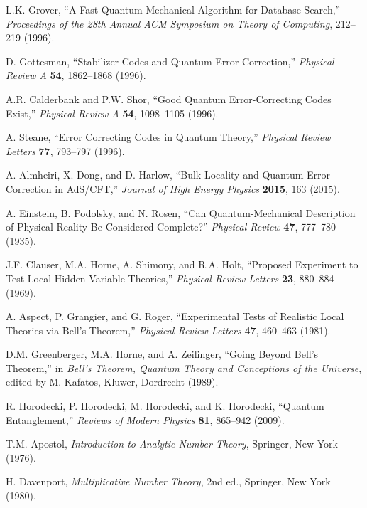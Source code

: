\documentclass[11pt]{article}
\theoremstyle{plain}
\theoremstyle{definition}
\theoremstyle{remark}
\begin{document}
\begin{thebibliography}{99}
 L.K. Grover, ``A Fast Quantum Mechanical Algorithm for Database Search,'' \emph{Proceedings of the 28th Annual ACM Symposium on Theory of Computing}, 212--219 (1996).

 D. Gottesman, ``Stabilizer Codes and Quantum Error Correction,'' \emph{Physical Review A} \textbf{54}, 1862--1868 (1996).

 A.R. Calderbank and P.W. Shor, ``Good Quantum Error-Correcting Codes Exist,'' \emph{Physical Review A} \textbf{54}, 1098--1105 (1996).

 A. Steane, ``Error Correcting Codes in Quantum Theory,'' \emph{Physical Review Letters} \textbf{77}, 793--797 (1996).

 A. Almheiri, X. Dong, and D. Harlow, ``Bulk Locality and Quantum Error Correction in AdS/CFT,'' \emph{Journal of High Energy Physics} \textbf{2015}, 163 (2015).

 A. Einstein, B. Podolsky, and N. Rosen, ``Can Quantum-Mechanical Description of Physical Reality Be Considered Complete?'' \emph{Physical Review} \textbf{47}, 777--780 (1935).

 J.F. Clauser, M.A. Horne, A. Shimony, and R.A. Holt, ``Proposed Experiment to Test Local Hidden-Variable Theories,'' \emph{Physical Review Letters} \textbf{23}, 880--884 (1969).

 A. Aspect, P. Grangier, and G. Roger, ``Experimental Tests of Realistic Local Theories via Bell's Theorem,'' \emph{Physical Review Letters} \textbf{47}, 460--463 (1981).

 D.M. Greenberger, M.A. Horne, and A. Zeilinger, ``Going Beyond Bell's Theorem,'' in \emph{Bell's Theorem, Quantum Theory and Conceptions of the Universe}, edited by M. Kafatos, Kluwer, Dordrecht (1989).

 R. Horodecki, P. Horodecki, M. Horodecki, and K. Horodecki, ``Quantum Entanglement,'' \emph{Reviews of Modern Physics} \textbf{81}, 865--942 (2009).

 T.M. Apostol, \emph{Introduction to Analytic Number Theory}, Springer, New York (1976).

 H. Davenport, \emph{Multiplicative Number Theory}, 2nd ed., Springer, New York (1980).


\end{thebibliography}
\end{document}
